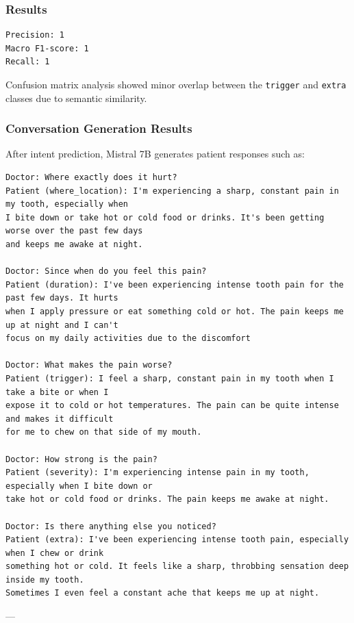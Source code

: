 \subsubsection*{Results}

\begin{verbatim}
Precision: 1
Macro F1-score: 1
Recall: 1
\end{verbatim}

Confusion matrix analysis showed minor overlap between the \texttt{trigger} and \texttt{extra} classes due to semantic similarity.


\subsubsection*{Conversation Generation Results}

After intent prediction, Mistral 7B generates patient responses such as:

\begin{verbatim}
Doctor: Where exactly does it hurt?
Patient (where_location): I'm experiencing a sharp, constant pain in my tooth, especially when 
I bite down or take hot or cold food or drinks. It's been getting worse over the past few days 
and keeps me awake at night.

Doctor: Since when do you feel this pain?
Patient (duration): I've been experiencing intense tooth pain for the past few days. It hurts 
when I apply pressure or eat something cold or hot. The pain keeps me up at night and I can't 
focus on my daily activities due to the discomfort

Doctor: What makes the pain worse?
Patient (trigger): I feel a sharp, constant pain in my tooth when I take a bite or when I 
expose it to cold or hot temperatures. The pain can be quite intense and makes it difficult 
for me to chew on that side of my mouth.

Doctor: How strong is the pain?
Patient (severity): I'm experiencing intense pain in my tooth, especially when I bite down or
take hot or cold food or drinks. The pain keeps me awake at night.

Doctor: Is there anything else you noticed?
Patient (extra): I've been experiencing intense tooth pain, especially when I chew or drink 
something hot or cold. It feels like a sharp, throbbing sensation deep inside my tooth.
Sometimes I even feel a constant ache that keeps me up at night.

\end{verbatim}

---

